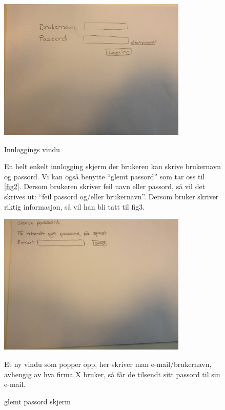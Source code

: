 \begin{figure}[ht!]
\includegraphics[width=90mm]{fig1.jpg}
\caption{Innloggings vindu}
\label{fig1}


En helt enkelt innlogging skjerm der brukeren kan skrive brukernavn og passord. Vi kan også benytte “glemt passord” som tar oss til \ref{fig2}. Dersom brukeren skriver feil navn eller passord, så vil det skrives ut: “feil passord og/eller brukernavn”. Dersom bruker skriver riktig informasjon, så vil han bli tatt til fig3.


\includegraphics[width=90mm]{fig2.jpg}
\caption{glemt passord skjerm}
\label{overflow}
Et ny vindu som popper opp, her skriver man e-mail/brukernavn, avhengig av hva firma X bruker, så får de tilsendt sitt passord til sin e-mail.
\end{figure}


